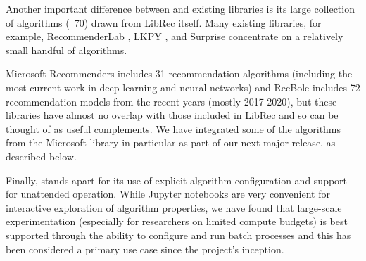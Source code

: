 Another important difference between \libauto{} and existing libraries is its large collection of algorithms (~70) drawn from LibRec itself. Many existing libraries, for example, RecommenderLab \cite{hahsler2015recommenderlab}, LKPY \cite{LensKit2020}, and Surprise \cite{Hug2020} concentrate on a relatively small handful of algorithms.

Microsoft Recommenders \cite{MicrosoftRecommenders} includes 31 recommendation algorithms (including the most current work in deep learning and neural networks) and RecBole \cite{recbole} includes 72 recommendation models from the recent years (mostly 2017-2020), but these libraries have almost no overlap with those included in LibRec and so can be thought of as useful complements. We have integrated some of the algorithms from the Microsoft library in particular as part of our next major release, as described below.


Finally, \libauto{} stands apart for its use of explicit algorithm configuration and support for unattended operation. While Jupyter notebooks are very convenient for interactive exploration of algorithm properties, we have found that large-scale experimentation (especially for researchers on limited compute budgets) is best supported through the ability to configure and run batch processes and this has been considered a primary use case since the project's inception.



